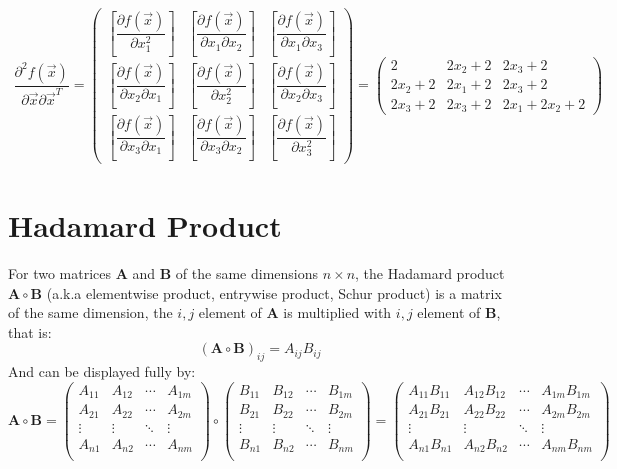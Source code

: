 \documentclass[conference,final,11pt,technote,onecolumn]{IEEEtran}\usepackage[]{graphicx}\usepackage[]{color}
\begin{document}
\begin{eqnarray}
\nonumber \dfrac{\partial^2 f(\vec x)}{\partial \vec x\partial \vec x^T} = \begin{pmatrix} \left[ \dfrac{\partial f(\vec x)}{\partial x^2_1}\right] & \left[ \dfrac{\partial f(\vec x)}{\partial x_1 \partial x_2}\right] & \left[ \dfrac{\partial f(\vec x)}{\partial x_1 \partial x_3}\right]\\
\left[ \dfrac{\partial f(\vec x)}{\partial x_2\partial x_1}\right] & \left[ \dfrac{\partial f(\vec x)}{\partial x^2_2}\right] & \left[ \dfrac{\partial f(\vec x)}{\partial x_2 \partial x_3}\right]\\
\left[ \dfrac{\partial f(\vec x)}{\partial x_3\partial x_1}\right] & \left[ \dfrac{\partial f(\vec x)}{\partial x_3 \partial x_2}\right] & \left[ \dfrac{\partial f(\vec x)}{\partial x^2_3}\right]
 \end{pmatrix} = \begin{pmatrix}2 & 2x_2+2 & 2x_3+2\\
 2x_2+2 & 2x_1+2 & 2x_3+2\\
 2x_3+2 & 2x_3+2 & 2x_1+2x_2+2
 \end{pmatrix}
\end{eqnarray}


\section{Hadamard Product}
\label{term:hadamard_product}
For two matrices $\mathbf{A}$ and $\mathbf{B}$ of the same dimensions $n\times n$, the Hadamard product $\mathbf{A}\circ \mathbf{B}$ (a.k.a elementwise product, entrywise product, Schur product) is a matrix of the same dimension, the $i,j$ element of $\mathbf{A}$ is multiplied with $i,j$ element of $\mathbf{B}$, that is:
\[ (\mathbf{A} \circ \mathbf{B})_{ij} = A_{ij}B_{ij}\]
And can be displayed fully by:
\[
 \mathbf{A} \circ \mathbf{B} = \begin{pmatrix} A_{11} & A_{12} & \cdots & A_{1m} \\
 A_{21} & A_{22} & \cdots & A_{2m} \\
\vdots & \vdots & \ddots & \vdots \\
 A_{n1} & A_{n2} & \cdots & A_{nm} \\
\end{pmatrix}\circ\begin{pmatrix}
 B_{11} & B_{12} & \cdots & B_{1m} \\
 B_{21} & B_{22} & \cdots & B_{2m} \\
\vdots & \vdots & \ddots & \vdots \\
 B_{n1} & B_{n2} & \cdots & B_{nm} \\
\end{pmatrix} =\begin{pmatrix}
 A_{11}B_{11} & A_{12}B_{12} & \cdots & A_{1m}B_{1m} \\
 A_{21}B_{21} & A_{22}B_{22} & \cdots & A_{2m}B_{2m} \\
\vdots & \vdots & \ddots & \vdots \\
 A_{n1}B_{n1} & A_{n2}B_{n2} & \cdots & A_{nm}B_{nm} \\
\end{pmatrix}
\]
\end{document}
